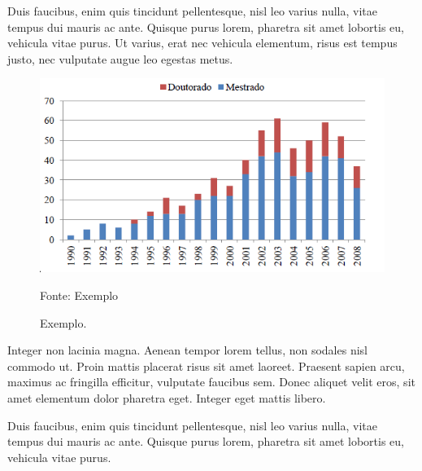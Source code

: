 Duis faucibus, enim quis tincidunt pellentesque, nisl leo varius nulla, vitae tempus dui mauris ac ante. Quisque purus lorem, pharetra sit amet lobortis eu, vehicula vitae purus. Ut varius, erat nec vehicula elementum, risus est tempus justo, nec vulputate augue leo egestas metus.

\begin{figure}[htb]
    \centering\includegraphics[width=.80\textwidth]{figuras/figura-3.png}
    \caption{\label{fig:exemplo-3}Exemplo.}
    
    Fonte: Exemplo%
\end{figure}

Integer non lacinia magna. Aenean tempor lorem tellus, non sodales nisl commodo ut. Proin mattis placerat risus sit amet laoreet. Praesent sapien arcu, maximus ac fringilla efficitur, vulputate faucibus sem. Donec aliquet velit eros, sit amet elementum dolor pharetra eget. Integer eget mattis libero.

\begin{table}[htb]
\centering
\caption{\label{tab:exemplo-tabela}Lista de trabalhos considerando as visualizações disponibilizadas}%
\end{table}
	
Duis faucibus, enim quis tincidunt pellentesque, nisl leo varius nulla, vitae tempus dui mauris ac ante. Quisque purus lorem, pharetra sit amet lobortis eu, vehicula vitae purus.